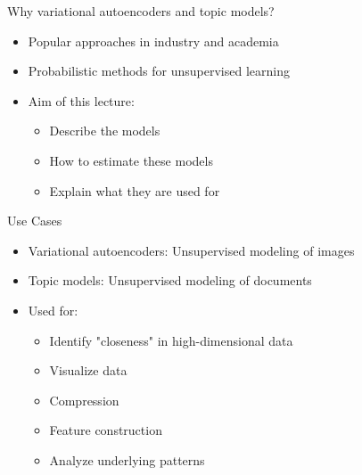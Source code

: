 \documentclass[10pt]{beamer}
\begin{document}
\begin{frame}{Why variational autoencoders and topic models?}
\begin{itemize}
\item Popular approaches in {\color{uured}industry and academia}
\item {\color{uured}Probabilistic} methods for unsupervised learning\pause
\item {\color{uured}Aim} of this lecture:
\begin{itemize}
\item Describe the models
\item How to estimate these models
\item Explain what they are used for
\end{itemize}
\end{itemize}
\end{frame}

\begin{frame}{Use Cases}

\begin{itemize}
\item Variational autoencoders: Unsupervised modeling of {\color{uured}images}
\item Topic models: Unsupervised modeling of {\color{uured}documents}
\end{itemize}

\pause

\begin{itemize}
\item Used for:
\begin{itemize}
\item Identify "{\color{uured}closeness}" in high-dimensional data\pause
\item {\color{uured}Visualize} data\pause
\item {\color{uured}Compression}\pause
\item {\color{uured}Feature construction}\pause
\item Analyze underlying {\color{uured}patterns}
\end{itemize}
\end{itemize}

\end{frame}
\end{document}
